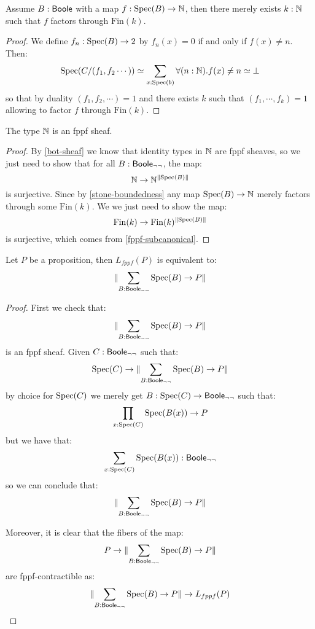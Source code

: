 \begin{lemma}\label{stone-boundedness}
Assume $B:\mathsf{Boole}$ with a map $f:\operatorname{Spec}(B)\to\mathbb{N}$, then there merely exists $k:\mathbb{N}$ such that $f$ factors through $\mathrm{Fin}(k)$.
\end{lemma}

\begin{proof}
We define $f_n:\operatorname{Spec}(B)\to {2}$ by $f_n(x) = 0$ if and only if $f(x)\not=n$. Then:
\[\operatorname{Spec}(C/(f_1,f_2\cdots)) \simeq \sum_{x:\operatorname{Spec}(b)}\forall (n:\mathbb{N}). f(x)\not=n \simeq \bot\]
so that by duality $(f_1,f_2,\cdots) = 1$ and there exists $k$ such that $(f_1,\cdots,f_k)=1$ allowing to factor $f$ through $\mathrm{Fin}(k)$.
\end{proof}

\begin{lemma}\label{nat-sheaf}
The type $\mathbb{N}$ is an fppf sheaf.
\end{lemma}

\begin{proof}
By \cref{bot-sheaf} we know that identity types in $\mathbb{N}$ are fppf sheaves, so we just need to show that for all $B:\mathsf{Boole}_{\neg\neg}$, the map:
\[\mathbb{N}\to \mathbb{N}^{\lVert \operatorname{Spec}(B) \rVert}\]
is surjective. Since by \cref{stone-boundedness} any map $\operatorname{Spec}(B)\to \mathbb{N}$ merely factors through some $\mathrm{Fin}(k)$. We we just need to show the map:
\[\mathrm{Fin}(k)\to \mathrm{Fin}(k)^{\lVert \operatorname{Spec}(B) \rVert}\]
is surjective, which comes from \cref{fppf-subcanonical}.
\end{proof}

\begin{lemma}\label{proposition-fppf-sheaf}
Let $P$ be a proposition, then $L_{fppf}(P)$ is equivalent to:
\[\lVert \sum_{B:\mathsf{Boole}_{\neg\neg}} \operatorname{Spec}(B)\to P \rVert\]
\end{lemma}

\begin{proof}
First we check that: 
\[\lVert \sum_{B:\mathsf{Boole}_{\neg\neg}}\operatorname{Spec}(B)\to P \rVert\]
is an fppf sheaf. Given $C:\mathsf{Boole}_{\neg\neg}$ such that:
\[\operatorname{Spec}(C)\to \lVert \sum_{B:\mathsf{Boole}_{\neg\neg}}\operatorname{Spec}(B)\to P \rVert\]
by choice for $\operatorname{Spec}(C)$ we merely get $B:\operatorname{Spec}(C)\to \mathsf{Boole}_{\neg\neg}$ such that:
\[\prod_{x:\operatorname{Spec}(C)}\operatorname{Spec}(B(x))\to P\]
but we have that:
\[\sum_{x:\operatorname{Spec}(C)}\operatorname{Spec}(B(x)):\mathsf{Boole}_{\neg\neg}\]
so we can conclude that:
\[\lVert \sum_{B:\mathsf{Boole}_{\neg\neg}}\operatorname{Spec}(B)\to P \rVert\]

Moreover, it is clear that the fibers of the map:
\[P\to \lVert \sum_{B:\mathsf{Boole}_{\neg\neg}}\operatorname{Spec}(B)\to P \rVert\] 
are fppf-contractible as:
\[\lVert \sum_{B:\mathsf{Boole}_{\neg\neg}}\operatorname{Spec}(B)\to P \rVert\to L_{fppf}(P)\]
\end{proof}

